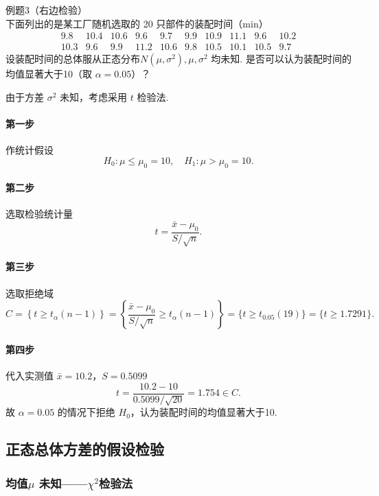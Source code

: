 \begin{question}{例题3（右边检验）}
    下面列出的是某工厂随机选取的 20 只部件的装配时间（min）
    $$
        \begin{array}{cccccccccc}
            9.8  & 10.4 & 10.6 & 9.6  & 9.7  & 9.9 & 10.9 & 11.1 & 9.6  & 10.2 \\
            10.3 & 9.6  & 9.9  & 11.2 & 10.6 & 9.8 & 10.5 & 10.1 & 10.5 & 9.7
        \end{array}
    $$
    设装配时间的总体服从正态分布$N(\mu, \sigma^2), \mu, \sigma^2$ 均未知. 是否可以认为装配时间的均值显著大于10（取 $\alpha=0.05$）？
\end{question}
\begin{solution}
    由于方差 $\sigma^2$ 未知，考虑采用 $t$ 检验法.
    \paragraph{第一步} 作统计假设
    $$
        H_0: \mu \leqslant \mu_0 = 10, \quad H_1: \mu > \mu_0 = 10.
    $$
    \paragraph{第二步} 选取检验统计量
    $$
        t = \frac{\bar{x}-\mu_0}{S/\sqrt{n}} .
    $$
    \paragraph{第三步} 选取拒绝域
    $$
        C = \left\{t \geqslant t_{\alpha}(n-1)\right\}
        = \left\{\frac{\bar{x}-\mu_0}{S/\sqrt{n}} \geqslant t_{\alpha}(n-1)\right\}
        = \{t \geqslant t_{0.05}(19)\}
        = \{t \geqslant 1.7291\}.
    $$
    \paragraph{第四步} 代入实测值 $\bar{x}=10.2$，$S=0.5099$
    $$
        t = \frac{10.2-10}{0.5099/\sqrt{20}} = 1.754 \in C.
    $$
    故 $\alpha = 0.05$ 的情况下拒绝 $H_0$，认为装配时间的均值显著大于10.
\end{solution}


\subsection{正态总体方差的假设检验}

\subsubsection{均值\texorpdfstring{$\mu$}{μ} 未知——\texorpdfstring{$\chi^2$}{x²}检验法}

